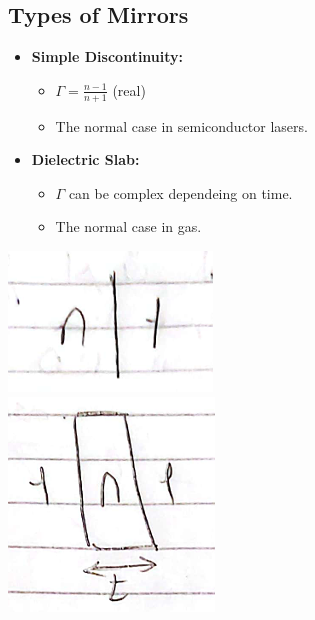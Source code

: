 \documentclass[11pt]{article}
\begin{document}
\subsection{Types of Mirrors}
\begin{minipage}{0.5\textwidth}
    \begin{itemize}
        \item \textbf{Simple Discontinuity:}
            \begin{itemize}
                \item $\Gamma = \frac{n-1}{n+1}$ (real)
                \item The normal case in semiconductor lasers.
            \end{itemize}
        \item \textbf{Dielectric Slab:}
            \begin{itemize}
                \item $\Gamma$ can be complex dependeing on time.
                \item The normal case in gas.
            \end{itemize}
    \end{itemize}
\end{minipage}
\begin{minipage}{0.45\textwidth}
    \centering
    \includegraphics[scale=0.6]{9.png} \\
    \includegraphics[scale=0.6]{10.png}
\end{minipage}
\end{document}
